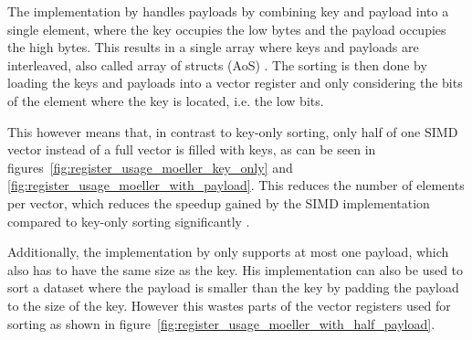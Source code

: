 \documentclass[12pt, a4paper, openright, twoside]{tiarbeit}
\begin{document}
The implementation by \citet{moeller_radix} handles payloads by combining key
and payload into
a single element, where the key occupies the low bytes and the payload
occupies the high bytes.
This results in a single array where keys and payloads are interleaved,
also called array of structs (AoS) \citep{intel_aos}.
The sorting is then done by loading the keys and payloads into a
vector register and only considering
the bits of the element where the key is located, i.e. the low bits.

This however means that, in contrast to key-only sorting, only half
of one SIMD vector instead of a full vector is filled with keys,
as can be seen in figures~\ref{fig:register_usage_moeller_key_only} and
\ref{fig:register_usage_moeller_with_payload}.
This reduces the number of elements per vector, which reduces the speedup
gained by the SIMD implementation compared to key-only sorting significantly
\citep{moeller_radix}.

Additionally, the implementation by \citet{moeller_radix} only supports at most
one payload, which also has to have the same size as the key.
His implementation can also be used to sort a dataset where the payload is
smaller than the key by padding the payload to the size of the key.
However this wastes parts of the vector registers used for sorting
as shown in figure~\ref{fig:register_usage_moeller_with_half_payload}.
\end{document}
